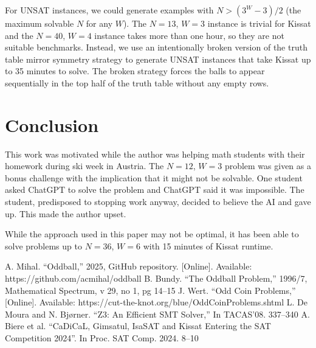 \documentclass[conference]{IEEEtran}
\begin{document}
For UNSAT instances, we could generate examples with $N > (3^W - 3) / 2$ (the maximum solvable $N$ for any $W$).
The $N=13$, $W=3$ instance is trivial for Kissat and the $N=40$, $W=4$ instance takes more than one hour, so they are not suitable
benchmarks.
Instead, we use an intentionally broken version of the truth table mirror symmetry strategy to generate UNSAT instances that take
Kissat up to 35 minutes to solve.
The broken strategy forces the balls to appear sequentially in the top half of the truth table without any empty rows.

\section{Conclusion}

This work was motivated while the author was helping math students with their homework during ski week in Austria.
The $N=12$, $W=3$ problem was given as a bonus challenge with the implication that it might not be solvable.
One student asked ChatGPT to solve the problem and ChatGPT said it was impossible.
The student, predisposed to stopping work anyway, decided to believe the AI and gave up.
This made the author upset.

While the approach used in this paper may not be optimal, it has been able to solve problems up to $N=36$, $W=6$
with 15 minutes of Kissat runtime.

\begin{thebibliography}{0}
 A. Mihal. ``Oddball,'' 2025, GitHub repository. [Online]. Available: https://github.com/acmihal/oddball
 B. Bundy. ``The Oddball Problem,'' 1996/7, Mathematical Spectrum, v 29, no 1, pg 14--15
 J. Wert. ``Odd Coin Problems,'' [Online]. Available: https://cut-the-knot.org/blue/OddCoinProblems.shtml
 L. De Moura and N. Bj{\o}rner. ``Z3: An Efficient SMT Solver,'' In TACAS'08. 337--340
 A. Biere et al. ``CaDiCaL, Gimsatul, IsaSAT and Kissat Entering the SAT Competition 2024''. In Proc. SAT Comp. 2024. 8--10
\end{thebibliography}
\end{document}
